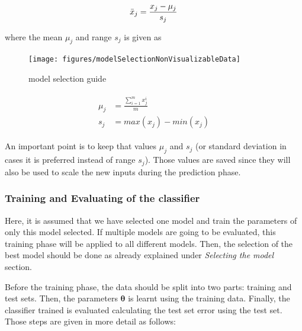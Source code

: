 \begin{equation}{\label{eqn:scalingFeatures}}
\bar{x}_j = \frac{x_j - \mu_j}{s_j} 
\end{equation} 

where the mean $\mu_j$ and range $s_j$ is given as

\begin{landscape}
\begin{figure}
\begin{center}
\texttt{[image: figures/modelSelectionNonVisualizableData]}    %
\caption{model selection guide} 
\label{fig:modelSelection}
\end{center}
\end{figure}
\end{landscape}

\begin{align}
\label{eqn:meandAndRange}
\begin{split}
\mu_j & = \frac{\sum\limits_{i=1}^m {x_j^i} }{m}
\\
s_j & = max(x_j) - min(x_j)
\end{split}
\end{align}

An important point is to keep that values $\mu_j$ and $s_j$ (or standard deviation in cases it is preferred instead of range $s_j$). 
Those values are saved since they will also be used to scale the new inputs during the prediction phase.


\subsubsection{Training and Evaluating of the classifier}

Here, it is assumed that we have selected one model and train the parameters of only this model selected. 
If multiple models are going to be evaluated, this training phase will be applied to all different models. 
Then, the selection of the best model should be done as already explained under \emph{Selecting the model} section.  

Before the training phase, the data should be split into two parts: training and test sets.
Then, the parameters $\bm{\theta}$ is learnt using the training data. 
Finally, the classifier trained is evaluated calculating the test set error using the test set.
Those steps are given in more detail as follows:
 
